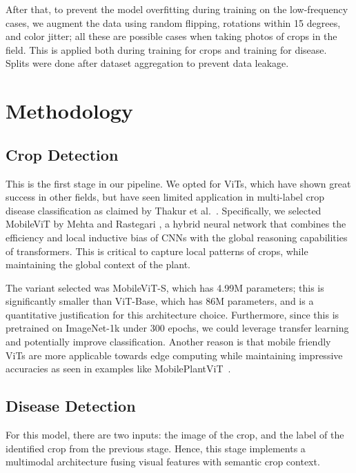 \documentclass[runningheads]{llncs}
\begin{document}
After that, to prevent the model overfitting during training on the low-frequency cases, we augment the data using random flipping, rotations within 15 degrees, and color jitter; all these are possible cases when taking photos of crops in the field. This is applied both during training for crops and training for disease. Splits were done after dataset aggregation to prevent data leakage.

\section{Methodology}
\label{sec:method}

\subsection{Crop Detection}

This is the first stage in our pipeline. We opted for ViTs, which have shown great success in other fields, but have seen limited application in multi-label crop disease classification as claimed by Thakur et al.~\cite{thakur2022plantvit}. Specifically, we selected MobileViT by Mehta and Rastegari \cite{mehta2022}, a hybrid neural network that combines the efficiency and local inductive bias of CNNs with the global reasoning capabilities of transformers. This is critical to capture local patterns of crops, while maintaining the global context of the plant.

The variant selected was MobileViT-S, which has 4.99M parameters; this is significantly smaller than ViT-Base, which has 86M parameters, and is a quantitative justification for this architecture choice. Furthermore, since this is pretrained on ImageNet-1k under 300 epochs, we could leverage transfer learning and potentially improve classification. Another reason is that mobile friendly ViTs are more applicable towards edge computing while maintaining impressive accuracies as seen in examples like MobilePlantViT~\cite{tonmoy2025mobileplantvit}.

\subsection{Disease Detection}
For this model, there are two inputs: the image of the crop, and the label of the identified crop from the previous stage. Hence, this stage implements a multimodal architecture fusing visual features with semantic crop context.
\end{document}
